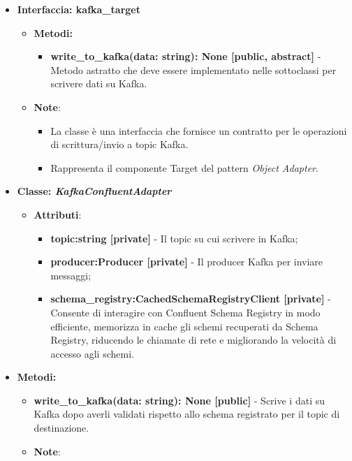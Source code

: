 \begin{itemize}
\begin{itemize}
\begin{itemize}
        \end{itemize}
    \end{itemize}
    \item{\textbf{Interfaccia: kafka\_target}}
    \begin{itemize}
        \item \textbf{Metodi: }
        \begin{itemize}
            \item \textbf{write\_to\_kafka(data: string): None [public, abstract]} - Metodo astratto che deve essere implementato nelle sottoclassi per scrivere dati su Kafka.
        \end{itemize}
        \item\textbf{Note}:
        \begin{itemize}
            \item La classe è una interfaccia che fornisce un contratto per le operazioni di scrittura/invio a topic Kafka.
            \item Rappresenta il componente Target del pattern \textit{Object Adapter}.
        \end{itemize}
    \end{itemize}
    \item{\textbf{Classe: \textit{KafkaConfluentAdapter}}}
    \begin{itemize}
        \item\textbf{Attributi}:
        \begin{itemize}
            \item \textbf{topic:string [private]} - Il topic su cui scrivere in Kafka;
            \item \textbf{producer:Producer [private]} - Il producer Kafka per inviare messaggi;
            \item \textbf{schema\_registry:CachedSchemaRegistryClient [private]} - Consente di interagire con Confluent Schema Registry in modo efficiente, memorizza in cache gli schemi recuperati da Schema Registry, riducendo le chiamate di rete e migliorando la velocità di accesso agli schemi.
        \end{itemize}
    \end{itemize}
    \item \textbf{Metodi: }
    \begin{itemize}
        \item \textbf{write\_to\_kafka(data: string): None [public]} - Scrive i dati su Kafka dopo averli validati rispetto allo schema registrato per il topic di destinazione.
    \item\textbf{Note}:

\end{itemize}
\end{itemize}
